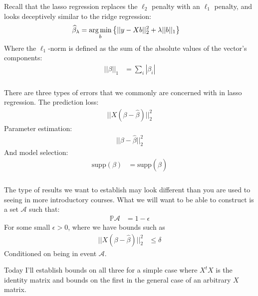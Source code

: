 \begin{frame}[fragile] \frametitle{}

Recall that the lasso regression replaces the $\ell_2$ penalty with an $\ell_1$ penalty,
and looks deceptively similar to the ridge regression:
\begin{align*}
\widehat{\beta}_\lambda &= \mathop{\mathrm{arg\,min}}_b \left\{ || y - Xb ||_2^2 + \lambda ||b||_1 \right\}
\end{align*}
Where the $\ell_1$-norm is defined as the sum of the absolute values of the
vector's components:
\begin{align*}
|| \beta ||_1 &= \sum_i | \beta_i |
\end{align*}

\end{frame}

\begin{frame}[fragile] \frametitle{}

There are three types of errors that we commonly are concerned
with in lasso regression. \pause The prediction loss:
\begin{align*}
|| X (\beta - \widehat{\beta}) ||_2^2
\end{align*}
\pause Parameter estimation:
\begin{align*}
|| \beta - \widehat{\beta} ||_2^2
\end{align*}
\pause And model selection:
\begin{align*}
\text{supp} (\beta) &= \text{supp} (\widehat{\beta})
\end{align*}

\end{frame}

\begin{frame}[fragile] \frametitle{}

The type of results we want to establish may look different than
you are used to seeing in more introductory courses.
\pause What we will want to be able to construct is a set
$\mathcal{A}$ such that:
\begin{align*}
\mathbb{P} \mathcal{A} &= 1 - \epsilon
\end{align*}
For some small $\epsilon > 0$, where we have bounds such as
\begin{align*}
|| X (\beta - \widehat{\beta}) ||_2^2 &\leq \delta
\end{align*}
Conditioned on being in event $\mathcal{A}$.

\pause Today I'll establish bounds on all three for a simple case
where $X^tX$ is the identity matrix and bounds on the first in the
general case of an arbitrary $X$ matrix.

\end{frame}

